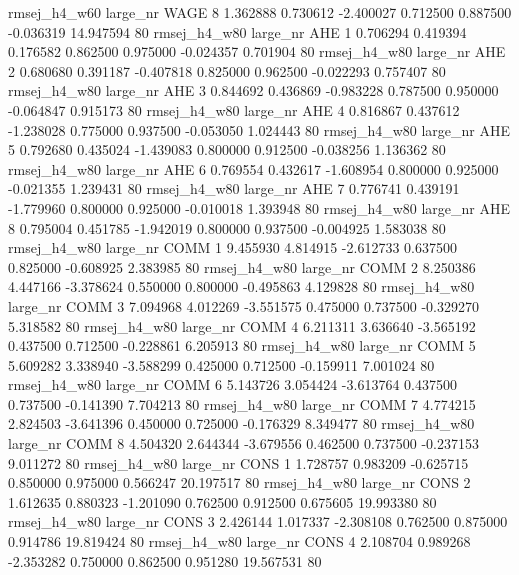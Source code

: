 rmsej_h4_w60   large_nr     WAGE                 8  1.362888  0.730612  -2.400027 0.712500 0.887500 -0.036319   14.947594 80
rmsej_h4_w80   large_nr      AHE                 1  0.706294  0.419394   0.176582 0.862500 0.975000 -0.024357    0.701904 80
rmsej_h4_w80   large_nr      AHE                 2  0.680680  0.391187  -0.407818 0.825000 0.962500 -0.022293    0.757407 80
rmsej_h4_w80   large_nr      AHE                 3  0.844692  0.436869  -0.983228 0.787500 0.950000 -0.064847    0.915173 80
rmsej_h4_w80   large_nr      AHE                 4  0.816867  0.437612  -1.238028 0.775000 0.937500 -0.053050    1.024443 80
rmsej_h4_w80   large_nr      AHE                 5  0.792680  0.435024  -1.439083 0.800000 0.912500 -0.038256    1.136362 80
rmsej_h4_w80   large_nr      AHE                 6  0.769554  0.432617  -1.608954 0.800000 0.925000 -0.021355    1.239431 80
rmsej_h4_w80   large_nr      AHE                 7  0.776741  0.439191  -1.779960 0.800000 0.925000 -0.010018    1.393948 80
rmsej_h4_w80   large_nr      AHE                 8  0.795004  0.451785  -1.942019 0.800000 0.937500 -0.004925    1.583038 80
rmsej_h4_w80   large_nr     COMM                 1  9.455930  4.814915  -2.612733 0.637500 0.825000 -0.608925    2.383985 80
rmsej_h4_w80   large_nr     COMM                 2  8.250386  4.447166  -3.378624 0.550000 0.800000 -0.495863    4.129828 80
rmsej_h4_w80   large_nr     COMM                 3  7.094968  4.012269  -3.551575 0.475000 0.737500 -0.329270    5.318582 80
rmsej_h4_w80   large_nr     COMM                 4  6.211311  3.636640  -3.565192 0.437500 0.712500 -0.228861    6.205913 80
rmsej_h4_w80   large_nr     COMM                 5  5.609282  3.338940  -3.588299 0.425000 0.712500 -0.159911    7.001024 80
rmsej_h4_w80   large_nr     COMM                 6  5.143726  3.054424  -3.613764 0.437500 0.737500 -0.141390    7.704213 80
rmsej_h4_w80   large_nr     COMM                 7  4.774215  2.824503  -3.641396 0.450000 0.725000 -0.176329    8.349477 80
rmsej_h4_w80   large_nr     COMM                 8  4.504320  2.644344  -3.679556 0.462500 0.737500 -0.237153    9.011272 80
rmsej_h4_w80   large_nr     CONS                 1  1.728757  0.983209  -0.625715 0.850000 0.975000  0.566247   20.197517 80
rmsej_h4_w80   large_nr     CONS                 2  1.612635  0.880323  -1.201090 0.762500 0.912500  0.675605   19.993380 80
rmsej_h4_w80   large_nr     CONS                 3  2.426144  1.017337  -2.308108 0.762500 0.875000  0.914786   19.819424 80
rmsej_h4_w80   large_nr     CONS                 4  2.108704  0.989268  -2.353282 0.750000 0.862500  0.951280   19.567531 80
